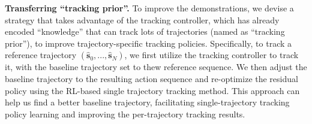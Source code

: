 




\noindent\textbf{Transferring \textcolor{myblue}{``tracking prior''}.} 
To \textcolor{myblue}{improve the demonstrations, we devise a strategy that takes advantage of the tracking controller, which has already encoded ``knowledge'' that can track lots of trajectories (named as ``tracking prior''), to improve trajectory-specific tracking policies}.
Specifically, to track a reference trajectory \((\hat{\mathbf{s}}_0, ..., \hat{\mathbf{s}}_N)\), we first utilize the tracking controller to track it, with the baseline trajectory set to thew reference sequence. We then adjust the baseline trajectory to the resulting action sequence and re-optimize the residual policy using the RL-based single trajectory tracking method. This approach can help us find a better baseline trajectory, facilitating single-trajectory tracking policy learning and improving the per-trajectory tracking results. 


